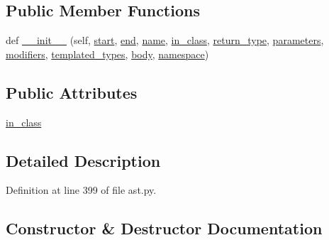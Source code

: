 \subsection*{Public Member Functions}
\begin{DoxyCompactItemize}
\item 
def \hyperlink{classcpp_1_1ast_1_1Method_aa3cbdc9c4b7e92b15fa6acea0dbf2322}{\+\_\+\+\_\+init\+\_\+\+\_\+} (self, \hyperlink{classcpp_1_1ast_1_1Node_a7b2aa97e6a049bb1a93aea48c48f1f44}{start}, \hyperlink{classcpp_1_1ast_1_1Node_a3c5e5246ccf619df28eca02e29d69647}{end}, \hyperlink{classcpp_1_1ast_1_1__GenericDeclaration_af774f4729dfd78d0538a6782fe8514c1}{name}, \hyperlink{classcpp_1_1ast_1_1Method_aa67244c3673afed43398b5d3e3fa6c1c}{in\+\_\+class}, \hyperlink{classcpp_1_1ast_1_1Function_af750fd788d7ab33163ee066534780212}{return\+\_\+type}, \hyperlink{classcpp_1_1ast_1_1Function_a0e61ef47af9cf2fd4402dbd8cab631ef}{parameters}, \hyperlink{classcpp_1_1ast_1_1Function_ad30eed435f1ff9ff34ade9cc0d7be121}{modifiers}, \hyperlink{classcpp_1_1ast_1_1Function_a57bb03218bade3240137a0d91c467cb6}{templated\+\_\+types}, \hyperlink{classcpp_1_1ast_1_1Function_a8e25e5016b23b38e32acf2df529c0650}{body}, \hyperlink{classcpp_1_1ast_1_1__GenericDeclaration_a8aee3f11b37449d54b42a78e0a689f46}{namespace})
\end{DoxyCompactItemize}
\subsection*{Public Attributes}
\begin{DoxyCompactItemize}
\item 
\hyperlink{classcpp_1_1ast_1_1Method_aa67244c3673afed43398b5d3e3fa6c1c}{in\+\_\+class}
\end{DoxyCompactItemize}


\subsection{Detailed Description}


Definition at line 399 of file ast.\+py.



\subsection{Constructor \& Destructor Documentation}
\mbox{\label{classcpp_1_1ast_1_1Method_aa3cbdc9c4b7e92b15fa6acea0dbf2322}} 
